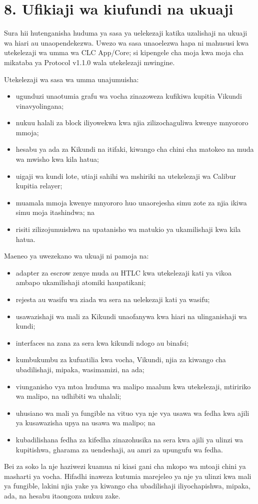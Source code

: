 \documentclass[11pt]{article}
\begin{document}
\section*{8. Ufikiaji wa kiufundi na ukuaji}

Sura hii hutenganisha huduma ya sasa ya uelekezaji katika uzalishaji na ukuaji wa hiari au unaopendekezwa. Uwezo wa sasa unaoelezwa hapa ni mahususi kwa utekelezaji wa umma wa CLC App/Core; si kipengele cha moja kwa moja cha mikataba ya Protocol v1.1.0 wala utekelezaji mwingine.

Utekelezaji wa sasa wa umma unajumuisha:

\begin{itemize}[leftmargin=*]
\item ugunduzi unaotumia grafu wa vocha zinazoweza kufikiwa kupitia Vikundi vinavyolingana;
\item nukuu halali za block iliyowekwa kwa njia zilizochaguliwa kwenye mnyororo mmoja;
\item hesabu ya ada za Kikundi na itifaki, kiwango cha chini cha matokeo na muda wa mwisho kwa kila hatua;
\item uigaji wa kundi lote, utiaji sahihi wa mshiriki na utekelezaji wa Calibur kupitia relayer;
\item muamala mmoja kwenye mnyororo huo unaorejesha simu zote za njia ikiwa simu moja itashindwa; na
\item risiti zilizojumuishwa na upatanisho wa matukio ya ukamilishaji kwa kila hatua.
\end{itemize}
Maeneo ya uwezekano wa ukuaji ni pamoja na:

\begin{itemize}[leftmargin=*]
\item adapter za escrow zenye muda au HTLC kwa utekelezaji kati ya vikoa ambapo ukamilishaji atomiki haupatikani;
\item rejesta au wasifu wa ziada wa sera na uelekezaji kati ya wasifu;
\item usawazishaji wa mali za Kikundi unaofanywa kwa hiari na ulinganishaji wa kundi;
\item interfaces na zana za sera kwa kikundi ndogo au binafsi;
\item kumbukumbu za kufuatilia kwa vocha, Vikundi, njia za kiwango cha ubadilishaji, mipaka, wasimamizi, na ada;
\item viunganisho vya mtoa huduma wa malipo maalum kwa utekelezaji, mtiririko wa malipo, na udhibiti wa uhalali;
\item uhusiano wa mali ya fungible na vituo vya nje vya usawa wa fedha kwa ajili ya kusawazisha upya na usawa wa malipo; na
\item kubadilishana fedha za kifedha zinazohusika na sera kwa ajili ya ulinzi wa kupitishwa, gharama za uendeshaji, au amri za upungufu wa fedha.
\end{itemize}
Bei za soko la nje haziwezi kuamua ni kiasi gani cha mkopo wa mtoaji chini ya masharti ya vocha. Hifadhi inaweza kutumia marejeleo ya nje ya ulinzi kwa mali ya fungible, lakini njia yake ya kiwango cha ubadilishaji iliyochapishwa, mipaka, ada, na hesabu itaongoza nukuu zake.
\end{document}
